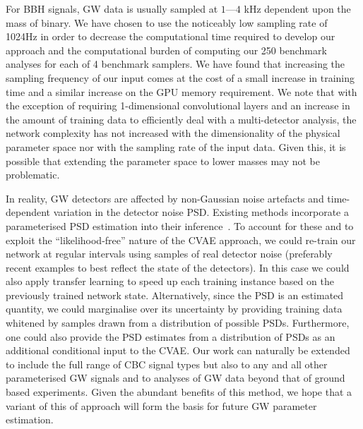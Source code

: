 %
%
For \ac{BBH} signals, \ac{GW} data is usually sampled at $1$---$4$ kHz dependent upon 
the mass of binary. We have chosen to use the noticeably low sampling rate of 1024Hz 
in order to decrease the computational time required to develop our approach and the 
computational burden of computing our 250 benchmark analyses for each of 
4 benchmark samplers.  We have found that increasing the sampling frequency of our 
input comes at the cost of a small increase in training time and a similar 
increase on the \ac{GPU} memory requirement. We note that with the exception of 
requiring 1-dimensional convolutional layers and an increase in the amount of 
training data to efficiently deal with a multi-detector analysis, the network 
complexity has not increased with the dimensionality of the physical parameter 
space nor with the sampling rate of the input data. Given this, it is possible  
that extending the parameter space to lower masses may not be problematic.

%
%
In reality, \ac{GW} detectors are affected by non-Gaussian noise artefacts and 
time-dependent variation in the detector noise \ac{PSD}. Existing methods 
incorporate a parameterised \ac{PSD} estimation into their inference~\cite{2015PhRvD..91h4034L}. 
To account for these and to exploit the ``likelihood-free'' nature of the 
\ac{CVAE} approach, we could re-train our network at regular intervals using samples 
of real detector noise (preferably recent examples to best reflect the state of the detectors). 
In this case we could also apply transfer learning to speed up each 
training instance based on the previously trained network state.  Alternatively, 
since the \ac{PSD} is an estimated quantity, we could 
marginalise over its uncertainty by providing training data whitened by 
samples drawn from a distribution of possible \acp{PSD}. Furthermore, one could also 
provide the \ac{PSD} estimates from a distribution of \acp{PSD} as an additional conditional 
input to the \ac{CVAE}. Our work can naturally be extended to include the full range 
of \ac{CBC} signal types but also to any and all other parameterised \ac{GW} 
signals and to analyses of \ac{GW} data beyond that of ground based 
experiments. Given the abundant benefits of this method, we hope that a 
variant of this of approach will form the basis for future \ac{GW} parameter estimation.

~
